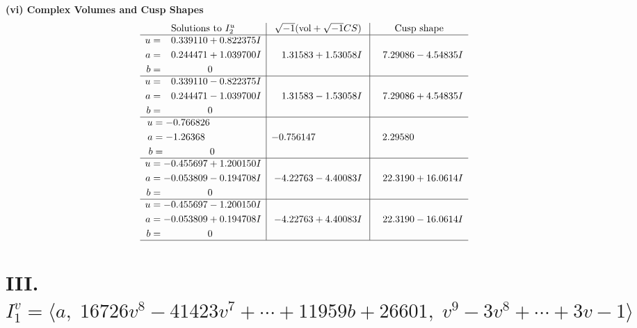 \documentclass[1p]{elsarticle_modified}
\theoremstyle{definition}
\newcommand{\I}{\sqrt{-1}}
\begin{document}
\newpage\flushleft \textbf{(vi) Complex Volumes and Cusp Shapes}
$$\begin{array}{c|c|c}  
\text{Solutions to }I^u_{2}& \I (\text{vol} + \sqrt{-1}CS) & \text{Cusp shape}\\
 \hline 
\begin{aligned}
u &= \phantom{-}0.339110 + 0.822375 I \\
a &= \phantom{-}0.244471 + 1.039700 I \\
b &= \phantom{-0.000000 } 0\end{aligned}
 & \phantom{-}1.31583 + 1.53058 I & \phantom{-}7.29086 - 4.54835 I \\ \hline\begin{aligned}
u &= \phantom{-}0.339110 - 0.822375 I \\
a &= \phantom{-}0.244471 - 1.039700 I \\
b &= \phantom{-0.000000 } 0\end{aligned}
 & \phantom{-}1.31583 - 1.53058 I & \phantom{-}7.29086 + 4.54835 I \\ \hline\begin{aligned}
u &= -0.766826\phantom{ +0.000000I} \\
a &= -1.26368\phantom{ +0.000000I} \\
b &= \phantom{-0.000000 } 0\end{aligned}
 & -0.756147\phantom{ +0.000000I} & \phantom{-}2.29580\phantom{ +0.000000I} \\ \hline\begin{aligned}
u &= -0.455697 + 1.200150 I \\
a &= -0.053809 - 0.194708 I \\
b &= \phantom{-0.000000 } 0\end{aligned}
 & -4.22763 - 4.40083 I & \phantom{-}22.3190 + 16.0614 I \\ \hline\begin{aligned}
u &= -0.455697 - 1.200150 I \\
a &= -0.053809 + 0.194708 I \\
b &= \phantom{-0.000000 } 0\end{aligned}
 & -4.22763 + 4.40083 I & \phantom{-}22.3190 - 16.0614 I\\
 \hline 
 \end{array}$$\newpage\newpage\renewcommand{\arraystretch}{1}
\centering \section*{III. $I^v_{1}= \langle a,\;16726 v^8-41423 v^7+\cdots+11959 b+26601,\;v^9-3 v^8+\cdots+3 v-1 \rangle$}
\end{document}
